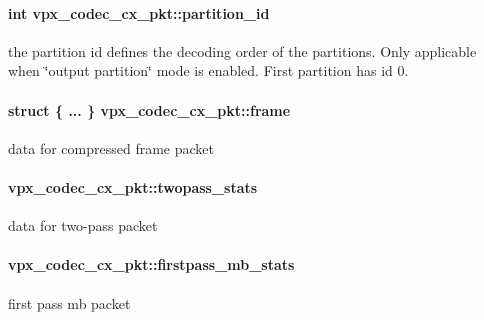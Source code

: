 \paragraph[{\texorpdfstring{partition\+\_\+id}{partition_id}}]{\setlength{\rightskip}{0pt plus 5cm}int vpx\+\_\+codec\+\_\+cx\+\_\+pkt\+::partition\+\_\+id}\hypertarget{structvpx__codec__cx__pkt_aaffee6af93af238ca7a145fb56c6d6f7}{}\label{structvpx__codec__cx__pkt_aaffee6af93af238ca7a145fb56c6d6f7}
the partition id defines the decoding order of the partitions. Only applicable when \char`\"{}output partition\char`\"{} mode is enabled. First partition has id 0. 
\paragraph[{\texorpdfstring{frame}{frame}}]{\setlength{\rightskip}{0pt plus 5cm}struct \{ ... \}   vpx\+\_\+codec\+\_\+cx\+\_\+pkt\+::frame}\hypertarget{structvpx__codec__cx__pkt_a81e33bf4408a3983abb16492fee359ff}{}\label{structvpx__codec__cx__pkt_a81e33bf4408a3983abb16492fee359ff}
data for compressed frame packet 
\paragraph[{\texorpdfstring{twopass\+\_\+stats}{twopass_stats}}]{ vpx\+\_\+codec\+\_\+cx\+\_\+pkt\+::twopass\+\_\+stats}\hypertarget{structvpx__codec__cx__pkt_a4018900fa26ecc55abc4703cc7d7c7fc}{}\label{structvpx__codec__cx__pkt_a4018900fa26ecc55abc4703cc7d7c7fc}
data for two-\/pass packet 
\paragraph[{\texorpdfstring{firstpass\+\_\+mb\+\_\+stats}{firstpass_mb_stats}}]{ vpx\+\_\+codec\+\_\+cx\+\_\+pkt\+::firstpass\+\_\+mb\+\_\+stats}\hypertarget{structvpx__codec__cx__pkt_a81574398a8834c03d8d6911a682429fb}{}\label{structvpx__codec__cx__pkt_a81574398a8834c03d8d6911a682429fb}
first pass mb packet 
